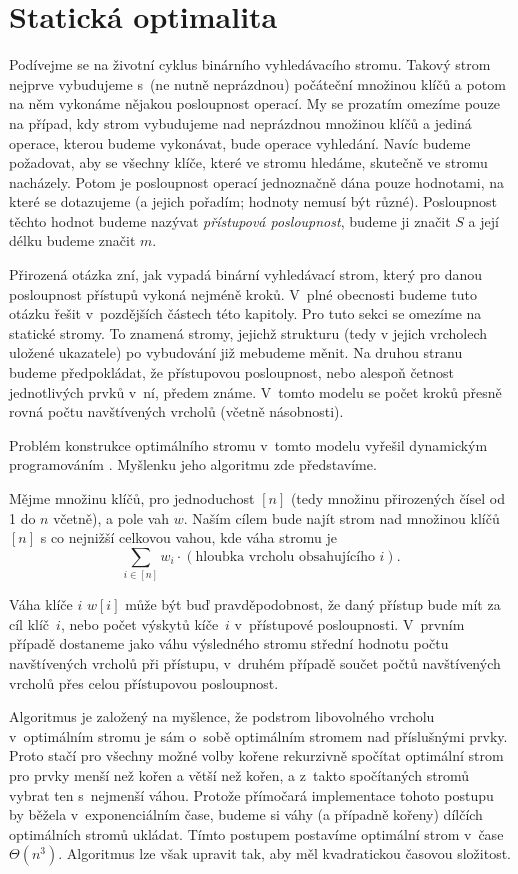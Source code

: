 \section{Statická optimalita}\label{sec:staticoptimality}

Podívejme se na životní cyklus binárního vyhledávacího stromu. Takový strom
nejprve vybudujeme s~(ne nutně neprázdnou) počáteční množinou klíčů
a potom na něm vykonáme nějakou posloupnost operací. My se prozatím omezíme
pouze na případ, kdy strom vybudujeme nad neprázdnou množinou klíčů a jediná
operace, kterou budeme vykonávat, bude operace vyhledání. Navíc budeme
požadovat, aby se všechny klíče, které ve stromu hledáme, skutečně ve stromu nacházely.
Potom je posloupnost operací jednoznačně dána pouze hodnotami, na které se
dotazujeme (a jejich pořadím; hodnoty nemusí být různé). Posloupnost těchto
hodnot budeme nazývat \emph{přístupová posloupnost}, budeme ji značit $S$ a
její délku budeme značit $m$.

Přirozená otázka zní, jak vypadá binární vyhledávací strom, který pro danou
posloupnost přístupů vykoná nejméně kroků. V~plné obecnosti budeme tuto otázku řešit v~pozdějších částech této kapitoly. Pro tuto sekci se omezíme na statické
stromy. To znamená stromy, jejichž strukturu (tedy v jejich vrcholech uložené
ukazatele) po vybudování již mebudeme měnit. Na druhou stranu budeme
předpokládat, že přístupovou posloupnost, nebo alespoň četnost jednotlivých
prvků v~ní, předem známe. V~tomto modelu se počet kroků přesně rovná počtu
navštívených vrcholů (včetně násobnosti).

Problém konstrukce optimálního stromu v~tomto modelu vyřešil dynamickým
programováním \citet{staticoptimality}. Myšlenku jeho algoritmu zde představíme.

Mějme množinu klíčů, pro jednoduchost $[n]$ (tedy
množinu přirozených čísel od 1 do $n$ včetně), a pole vah $w$. 
Naším cílem bude najít strom nad množinou klíčů $[n]$ s co nejnižší celkovou vahou, kde váha stromu je $$\sum_{i\in [n]}w_i\cdot (\text{hloubka vrcholu obsahujícího $i$}).$$ 

Váha klíče
$i$ $w[i]$ může být buď pravděpodobnost, že daný přístup bude mít za
cíl klíč~$i$, nebo počet výskytů kíče~$i$ v~přístupové
posloupnosti. V~prvním případě dostaneme jako váhu výsledného stromu střední
hodnotu počtu navštívených vrcholů při přístupu, v~druhém případě součet počtů navštívených vrcholů přes
celou přístupovou posloupnost.

Algoritmus je založený na myšlence, že podstrom libovolného vrcholu
v~optimálním stromu je sám o~sobě optimálním stromem nad příslušnými prvky. Proto
stačí pro všechny možné volby kořene rekurzivně spočítat optimální strom pro
prvky menší než kořen a větší než kořen, a z~takto spočítaných stromů vybrat
ten s~nejmenší váhou. Protože přímočará implementace tohoto postupu by běžela
v~exponenciálním čase, budeme si váhy (a případně kořeny) dílčích optimálních
stromů ukládat. Tímto postupem postavíme optimální strom
v~čase $\Theta(n^3)$. Algoritmus lze však upravit tak, aby měl kvadratickou časovou složitost.



